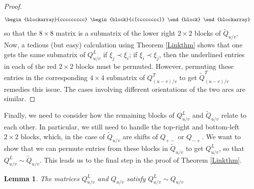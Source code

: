 \documentclass[11pt]{amsart}
\theoremstyle{plain}
\newtheorem{lemmaN}[theoremN]{Lemma}
\theoremstyle{definition}
\theoremstyle{remark}
\begin{document}
\begin{proof}
\begin{multline}
\begin{blockarray}{ccccccccc}
\begin{block}{c[cccccccc]}
    \end{block}
\end{blockarray}
\end{multline}
so that the $8\times 8$ matrix is a submatrix of the lower right $2\times 2$ blocks of $\widetilde{Q}_{u/v}$. Now, a tedious (but easy) calculation using Theorem \ref{Linkthm} shows that one gets the same submatrix of $Q_{u/v}^L$ if $\xi_j\prec\xi_i$; if $\xi_i\prec\xi_j$, then the underlined entries in each of the red $2\times 2$ blocks must be permuted. However, permuting these entries in the corresponding $4\times 4$ submatrix of $Q_{(u-v)/v}^T$ to get $\widetilde{Q}_{(u-v)/v}^T$ remedies this issue. The cases involving different orientations of the two arcs are similar.
\end{proof}

Finally, we need to consider how the remaining blocks of $Q_{u/v}^L$ and $\widetilde{Q}_{u/v}$ relate to each other. In particular, we still need to handle the top-right and bottom-left $2\times 2$ blocks, which, in the case of $\widetilde{Q}_{u/v}$ are shifts of $Q_{+-}$ or $Q_{-+}$. We want to show that we can permute entries from these blocks in $\widetilde{Q}_{u/v}$ to get $Q_{u/v}^L$, so that $Q_{u/v}^L\sim \widetilde{Q}_{u/v}$. This leads us to the final step in the proof of Theorem \ref{Linkthm}.



\begin{lemmaN}
\label{LQpmperm}
    The matrices $Q_{u/v}^L$ and $Q_{u/v}$ satisfy $Q_{u/v}^L\sim Q_{u/v}$
\end{lemmaN}
\end{document}
